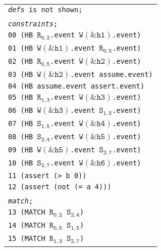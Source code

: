 \newsavebox{\boxSMTa}
\begin{lrbox}{\boxSMTa}
\normalsize
\begin{tabular}[c]{l}
\texttt{\textit{defs} is not shown;}\\
\\
\texttt{\textit{constraints};}\\
\texttt{00 (HB $\mathtt{R_{0,2}}$.event $\mathtt{W(\&h1)}$.event)}\\
\texttt{01 (HB $\mathtt{W(\&h1)}$.event $\mathtt{R_{0,5}}$.event)}\\
\texttt{02 (HB $\mathtt{R_{0,5}}$.event $\mathtt{W(\&h2)}$.event)}\\
\texttt{03 (HB $\mathtt{W(\&h2)}$.event assume.event)}\\
\texttt{04 (HB assume.event assert.event)}\\
\texttt{05 (HB $\mathtt{R_{1,3}}$.event $\mathtt{W(\&h3)}$.event)}\\
\texttt{06 (HB $\mathtt{W(\&h3)}$.event $\mathtt{S_{1,5}}$.event)}\\
\texttt{07 (HB $\mathtt{S_{1,5}}$.event $\mathtt{W(\&h4)}$.event)}\\
\texttt{08 (HB $\mathtt{S_{2,4}}$.event $\mathtt{W(\&h5)}$.event)}\\
\texttt{09 (HB $\mathtt{W(\&h5)}$.event $\mathtt{S_{2,7}}$.event)}\\
\texttt{10 (HB $\mathtt{S_{2,7}}$.event $\mathtt{W(\&h6)}$.event)}\\
\texttt{11 (assert (> b 0))}\\
\texttt{12 (assert (not (= a 4)))}\\
\\
\texttt{\textit{match};}\\
\texttt{13 (MATCH $\mathtt{R_{0,2}}$ $\mathtt{S_{2,4}}$)}\\
\texttt{14 (MATCH $\mathtt{R_{0,5}}$ $\mathtt{S_{1,5}}$)}\\
\texttt{15 (MATCH $\mathtt{R_{1,3}}$ $\mathtt{S_{2,7}}$)}\\

\end{tabular}
\end{lrbox}

